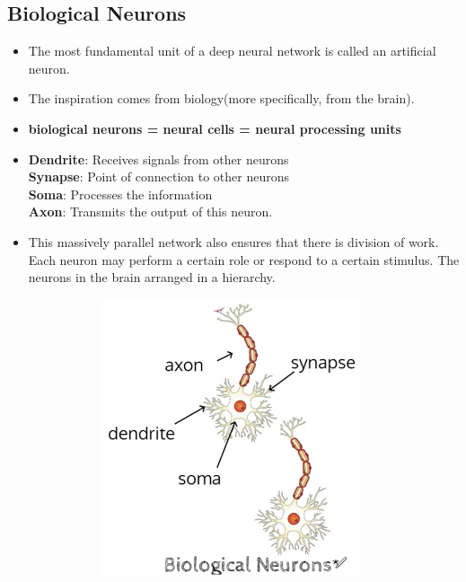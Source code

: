 \documentclass[a4paper]{article}
\begin{document}
\subsection{Biological Neurons}
\begin{itemize}
    \item The most fundamental unit of a deep neural network is called an artificial neuron.
    \item The inspiration comes from biology(more specifically, from the brain).
    \item \textbf{biological neurons = neural cells = neural processing units}
    \item \textbf{Dendrite}: Receives signals from other neurons\\
    \textbf{Synapse}: Point of connection to other neurons\\
    \textbf{Soma}: Processes the information\\
    \textbf{Axon}: Transmits the output of this neuron.
    \item This massively parallel network also ensures that there is division of work. Each neuron may perform a certain role or respond to a certain stimulus. The neurons in the brain arranged in a hierarchy.
    \begin{figure}[H]
        \centering
        \begin{subfigure}[b]{0.3\textwidth}
            \centering
            \includegraphics[width=0.9\textwidth]{Degree/static/DL_biological_neuron.png}

\end{subfigure}
\end{figure}
\end{itemize}
\end{document}
